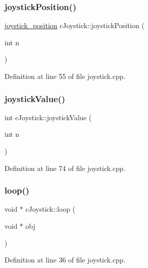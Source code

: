 \subsubsection{\texorpdfstring{joystick\+Position()}{joystickPosition()}}
{\footnotesize\ttfamily \hyperlink{structjoystick__position}{joystick\+\_\+position} c\+Joystick\+::joystick\+Position (\begin{DoxyParamCaption}\item[{int}]{n }\end{DoxyParamCaption})}



Definition at line 55 of file joystick.\+cpp.

\mbox{\label{classc_joystick_a2954017eb51ef6f4658450199e5df5b4}} 
\subsubsection{\texorpdfstring{joystick\+Value()}{joystickValue()}}
{\footnotesize\ttfamily int c\+Joystick\+::joystick\+Value (\begin{DoxyParamCaption}\item[{int}]{n }\end{DoxyParamCaption})}



Definition at line 74 of file joystick.\+cpp.

\mbox{\label{classc_joystick_aafa52c2e4d67c71f3d1e31b80d1dd324}} 
\subsubsection{\texorpdfstring{loop()}{loop()}}
{\footnotesize\ttfamily void $\ast$ c\+Joystick\+::loop (\begin{DoxyParamCaption}\item[{void $\ast$}]{obj }\end{DoxyParamCaption})\hspace{0.3cm}{\ttfamily [static]}}



Definition at line 36 of file joystick.\+cpp.

\mbox{\label{classc_joystick_a8c04dc903aac9588db3b3e81f495705a}} 
